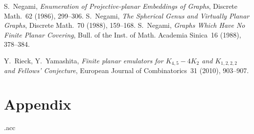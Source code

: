 \documentclass[envcountsect,envcountsame]{llncs}
\def\dotheappendixmagic{\immediate\closeout\accuwrite\jobname.acc}
\newenvironment{onlynoaccum}{}{}
\begin{document}
\begin{thebibliography}{99}
   S.~Negami, {\em Enumeration of Projective-planar Embeddings of Graphs\/},
   Discrete Math.~62 (1986), 299--306.
   S.~Negami, {\em The Spherical Genus and Virtually Planar Graphs\/},
   Discrete Math.~70 (1988), 159--168.
   S.~Negami, {\em Graphs Which Have No Finite Planar Covering\/}, 
   Bull. of the Inst. of Math. Academia Sinica~16 (1988), 378--384.



   Y.~Rieck, Y.~Yamashita, {\em Finite planar emulators for $K_{4,5}-4K_2$
	and $K_{1,2,2,2}$ and Fellows' Conjecture},
	European Journal of Combinatorics~31 (2010), 903--907.


\end{thebibliography}




\begin{onlynoaccum}
\newpage
\section*{\LARGE Appendix}
\def\thesection{A}

\dotheappendixmagic
\end{onlynoaccum}
\end{document}
